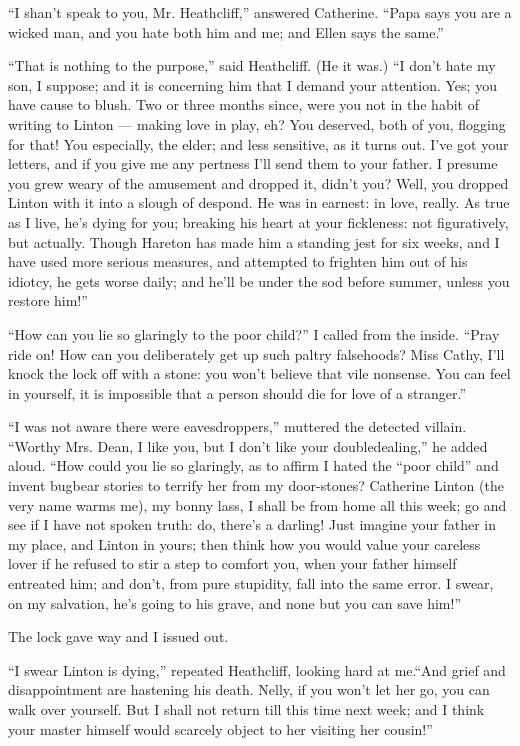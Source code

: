 \par “I shan't speak to you, Mr. Heathcliff,” answered Catherine. “Papa says you are a wicked man, and you hate both him and me; and Ellen says the same.”
\par “That is nothing to the purpose,” said Heathcliff. (He it was.) “I don't hate my son, I suppose; and it is concerning him that I demand your attention. Yes; you have cause to blush. Two or three months since, were you not in the habit of writing to Linton — making love in play, eh? You deserved, both of you, flogging for that! You especially, the elder; and less sensitive, as it turns out. I've got your letters, and if you give me any pertness I'll send them to your father. I presume you grew weary of the amusement and dropped it, didn't you? Well, you dropped Linton with it into a slough of despond. He was in earnest: in love, really. As true as I live, he's dying for you; breaking his heart at your fickleness: not figuratively, but actually. Though Hareton has made him a standing jest for six weeks, and I have used more serious measures, and attempted to frighten him out of his idiotcy, he gets worse daily; and he'll be under the sod before summer, unless you restore him!”
\par “How can you lie so glaringly to the poor child?” I called from the inside. “Pray ride on! How can you deliberately get up such paltry falsehoods? Miss Cathy, I'll knock the lock off with a stone: you won't believe that vile nonsense. You can feel in yourself, it is impossible that a person should die for love of a stranger.”
\par “I was not aware there were eavesdroppers,” muttered the detected villain. “Worthy Mrs. Dean, I like you, but I don't like your doubledealing,” he added aloud. “How could you lie so glaringly, as to affirm I hated the “poor child” and invent bugbear stories to terrify her from my door-stones? Catherine Linton (the very name warms me), my bonny lass, I shall be from home all this week; go and see if I have not spoken truth: do, there's a darling! Just imagine your father in my place, and Linton in yours; then think how you would value your careless lover if he refused to stir a step to comfort you, when your father himself entreated him; and don't, from pure stupidity, fall into the same error. I swear, on my salvation, he's going to his grave, and none but you can save him!”
\par The lock gave way and I issued out.
\par “I swear Linton is dying,” repeated Heathcliff, looking hard at me.“And grief and disappointment are hastening his death. Nelly, if you won't let her go, you can walk over yourself. But I shall not return till this time next week; and I think your master himself would scarcely object to her visiting her cousin!”
